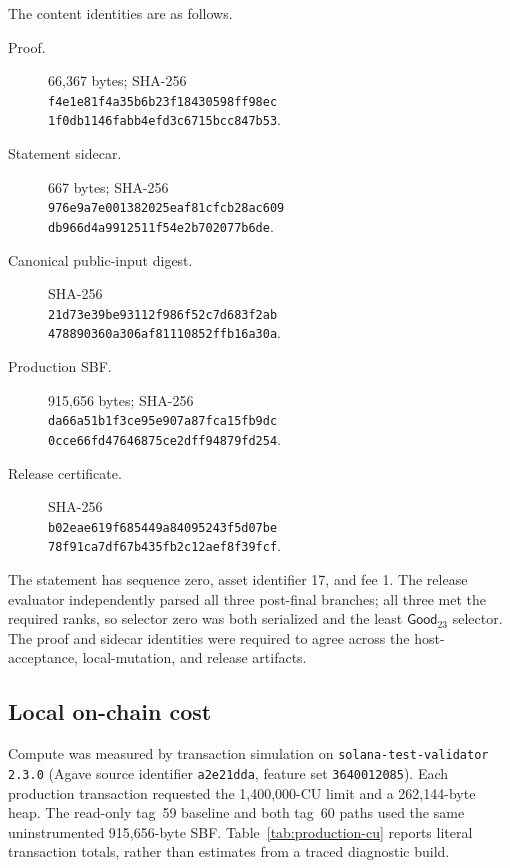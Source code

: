 The content identities are as follows.
\begin{description}
  \item[Proof.] 66,367 bytes; SHA-256\\
  \texttt{f4e1e81f4a35b6b23f18430598ff98ec}\\
  \texttt{1f0db1146fabb4efd3c6715bcc847b53}.
  \item[Statement sidecar.] 667 bytes; SHA-256\\
  \texttt{976e9a7e001382025eaf81cfcb28ac609}\\
  \texttt{db966d4a9912511f54e2b702077b6de}.
  \item[Canonical public-input digest.] SHA-256\\
  \texttt{21d73e39be93112f986f52c7d683f2ab}\\
  \texttt{478890360a306af81110852ffb16a30a}.
  \item[Production SBF.] 915,656 bytes; SHA-256\\
  \texttt{da66a51b1f3ce95e907a87fca15fb9dc}\\
  \texttt{0cce66fd47646875ce2dff94879fd254}.
  \item[Release certificate.] SHA-256\\
  \texttt{b02eae619f685449a84095243f5d07be}\\
  \texttt{78f91ca7df67b435fb2c12aef8f39fcf}.
\end{description}

The statement has sequence zero, asset identifier 17, and fee 1.  The release
evaluator independently parsed all three post-final branches; all three met
the required ranks, so selector zero was both serialized and the least
\(\mathsf{Good}_{23}\) selector.  The proof and sidecar identities were required
to agree across the host-acceptance, local-mutation, and release artifacts.

\subsection{Local on-chain cost}
\label{sec:evaluation-local-cu}

Compute was measured by transaction simulation on
\texttt{solana-test-validator 2.3.0} (Agave source identifier
\texttt{a2e21dda}, feature set \texttt{3640012085}).  Each production
transaction requested the 1,400,000-CU limit and a 262,144-byte heap.  The
read-only tag~59 baseline and both tag~60 paths used the same uninstrumented
915,656-byte SBF\@.  Table~\ref{tab:production-cu} reports literal transaction
totals, rather than estimates from a traced diagnostic build.

